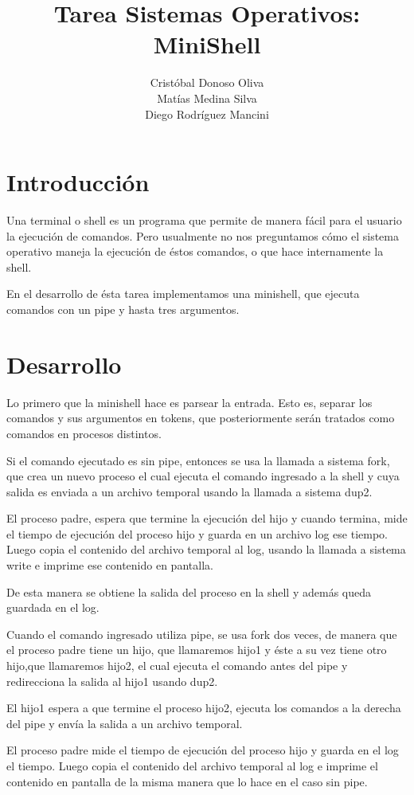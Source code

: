 \documentclass[11pt]{article}
\title{\textbf{Tarea Sistemas Operativos: MiniShell}}
\author{Cristóbal Donoso Oliva\\
		Matías Medina Silva\\
		Diego Rodríguez Mancini}
\date{}
\begin{document}
\maketitle

\section{Introducción}
Una terminal o shell es un programa que permite de manera fácil para el usuario la ejecución de comandos. Pero usualmente no nos preguntamos cómo el sistema operativo maneja la ejecución de éstos comandos, o que hace internamente la shell.

En el desarrollo de ésta tarea implementamos una minishell, que ejecuta comandos con un pipe y hasta tres argumentos.


\section{Desarrollo}
Lo primero que la minishell hace es parsear la entrada. Esto es, separar los comandos y sus argumentos en tokens, que posteriormente serán tratados como comandos en procesos distintos.

Si el comando ejecutado es sin pipe, entonces se usa la llamada a sistema fork, que crea un nuevo proceso el cual ejecuta el comando ingresado a la shell y cuya salida es enviada a un archivo temporal usando la llamada a sistema dup2.

El proceso padre, espera que termine la ejecución del hijo y cuando termina, mide el tiempo de ejecución del proceso hijo y guarda en un archivo log ese tiempo.
Luego copia el contenido del archivo temporal al log, usando la llamada a sistema write e imprime ese contenido en pantalla.

De esta manera se obtiene la salida del proceso en la shell y además queda guardada en el log.

Cuando el comando ingresado utiliza pipe, se usa fork dos veces, de manera que el proceso padre tiene un hijo, que llamaremos hijo1 y éste a su vez tiene otro hijo,que llamaremos hijo2, el cual ejecuta el comando antes del pipe y redirecciona la salida al hijo1 usando dup2.

El hijo1 espera a que termine el proceso hijo2, ejecuta los comandos a la derecha del pipe y envía la salida a un archivo temporal.

El proceso padre mide el tiempo de ejecución del proceso hijo y guarda en el log el tiempo. Luego copia el contenido del archivo temporal al log e imprime el contenido en pantalla de la misma manera que lo hace en el caso sin pipe.
\end{document}
